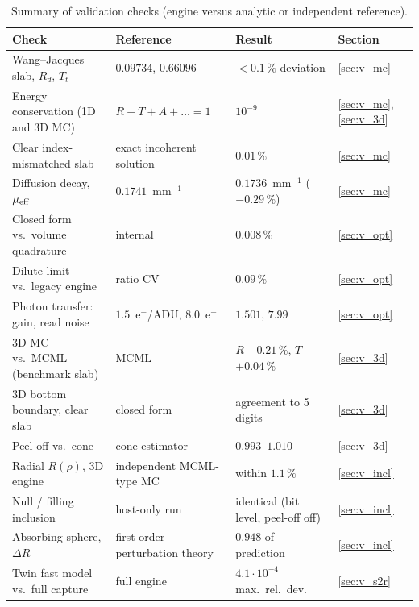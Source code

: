 \documentclass[journal]{IEEEtran}
\begin{document}
\begin{table}[!t]
\caption{Summary of validation checks (engine versus analytic or independent reference).}
\label{tab:valid}
\centering\small
\begin{tabular}{@{}llll@{}}
\toprule
Check & Reference & Result & Section\\
\midrule
Wang--Jacques slab, $R_d$, $T_t$ & $0.09734$, $0.66096$ & $<0.1\,\%$ deviation & \ref{sec:v_mc}\\
Energy conservation (1D and 3D MC) & $R+T+A+\ldots=1$ & $10^{-9}$ & \ref{sec:v_mc}, \ref{sec:v_3d}\\
Clear index-mismatched slab & exact incoherent solution & $0.01\,\%$ & \ref{sec:v_mc}\\
Diffusion decay, $\mu_{\rm eff}$ & $0.1741$~mm$^{-1}$ & $0.1736$~mm$^{-1}$ ($-0.29\,\%$) & \ref{sec:v_mc}\\
Closed form vs.\ volume quadrature & internal & $0.008\,\%$ & \ref{sec:v_opt}\\
Dilute limit vs.\ legacy engine & ratio CV & $0.09\,\%$ & \ref{sec:v_opt}\\
Photon transfer: gain, read noise & $1.5$~e$^-$/ADU, $8.0$~e$^-$ & $1.501$, $7.99$ & \ref{sec:v_opt}\\
3D MC vs.\ MCML (benchmark slab) & MCML & $R$ $-0.21\,\%$, $T$ $+0.04\,\%$ & \ref{sec:v_3d}\\
3D bottom boundary, clear slab & closed form & agreement to 5 digits & \ref{sec:v_3d}\\
Peel-off vs.\ cone & cone estimator & $0.993$--$1.010$ & \ref{sec:v_3d}\\
Radial $R(\rho)$, 3D engine & independent MCML-type MC & within $1.1\,\%$ & \ref{sec:v_incl}\\
Null / filling inclusion & host-only run & identical (bit level, peel-off off) & \ref{sec:v_incl}\\
Absorbing sphere, $\Delta R$ & first-order perturbation theory & $0.948$ of prediction & \ref{sec:v_incl}\\
Twin fast model vs.\ full capture & full engine & $4.1\cdot10^{-4}$ max.\ rel.\ dev. & \ref{sec:v_s2r}\\
\bottomrule
\end{tabular}
\end{table}
\end{document}
